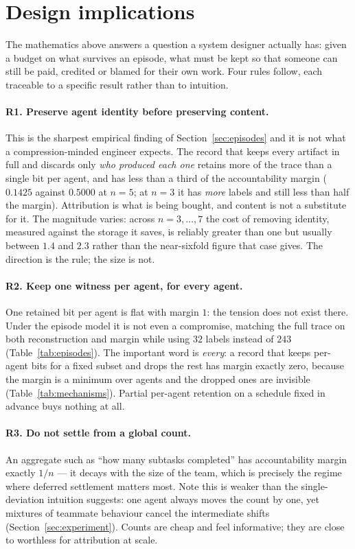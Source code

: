 \section{Design implications}
\label{sec:design}

The mathematics above answers a question a system designer actually has: given a
budget on what survives an episode, what must be kept so that someone can still
be paid, credited or blamed for their own work. Four rules follow, each traceable
to a specific result rather than to intuition.

\paragraph{R1. Preserve agent identity before preserving content.}
This is the sharpest empirical finding of Section~\ref{sec:episodes} and it is
not what a compression-minded engineer expects. The record that keeps every
artifact in full and discards only \emph{who produced each one} retains more of
the trace than a single bit per agent, and has less than a third of the
accountability margin ($0.1425$ against $0.5000$ at $n=5$; at $n = 3$ it has
\emph{more} labels and still less than half the margin). Attribution is what is
being bought, and content is not a substitute for it. The magnitude varies: across
$n = 3,\dots,7$ the cost of removing identity, measured against the storage it
saves, is reliably greater than one but usually between $1.4$ and $2.3$ rather
than the near-sixfold figure that case gives. The direction is the rule; the
size is not.

\paragraph{R2. Keep one witness per agent, for every agent.}
One retained bit per agent is flat with margin $1$: the tension does not exist
there. Under the episode model it is not even a compromise, matching the full
trace on both reconstruction and margin while using $32$ labels instead of $243$
(Table~\ref{tab:episodes}). The important word is \emph{every}: a record that
keeps per-agent bits for a fixed subset and drops the rest has margin exactly
zero, because the margin is a minimum over agents and the dropped ones are
invisible (Table~\ref{tab:mechanisms}). Partial per-agent retention on a schedule
fixed in advance buys nothing at all.

\paragraph{R3. Do not settle from a global count.}
An aggregate such as ``how many subtasks completed'' has accountability margin
exactly $1/n$ --- it decays with the size of the team, which is precisely the
regime where deferred settlement matters most. Note this is weaker than the
single-deviation intuition suggests: one agent always moves the count by one, yet
mixtures of teammate behaviour cancel the intermediate shifts
(Section~\ref{sec:experiment}). Counts are cheap and feel informative; they are
close to worthless for attribution at scale.

